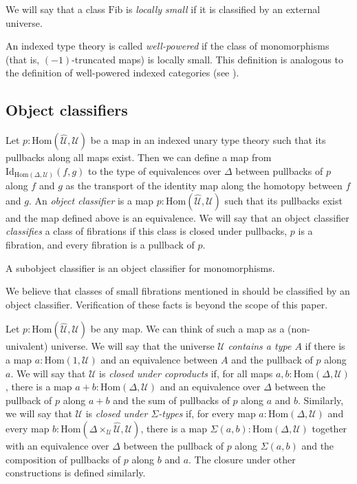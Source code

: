 \documentclass[reqno]{mscs}
\newcommand{\fs}[1]{\mathrm{#1}}
\newcommand{\Hom}{\fs{Hom}}
\newcommand{\Id}{\fs{Id}}
\newcommand{\Fib}{\fs{Fib}}
\numberwithin{figure}{section}
\begin{document}
\begin{defn}
We will say that a class $\Fib$ is \emph{locally small} if it is classified by an external universe.
\end{defn}

\begin{example}
An indexed type theory is called \emph{well-powered} if the class of monomorphisms (that is, $(-1)$-truncated maps) is locally small.
This definition is analogous to the definition of well-powered indexed categories (see \cite[Example~B1.3.14]{elephant}).
\end{example}

\subsection{Object classifiers}

Let $p : \Hom(\widehat{\mathcal{U}},\mathcal{U})$ be a map in an indexed unary type theory such that its pullbacks along all maps exist.
Then we can define a map from $\Id_{\Hom(\Delta,\mathcal{U})}(f,g)$ to the type of equivalences over $\Delta$ between pullbacks of $p$ along $f$ and $g$ as the transport of the identity map along the homotopy between $f$ and $g$.
An \emph{object classifier} is a map $p : \Hom(\widehat{\mathcal{U}},\mathcal{U})$ such that its pullbacks exist and the map defined above is an equivalence.
We will say that an object classifier \emph{classifies} a class of fibrations if this class is closed under pullbacks, $p$ is a fibration, and every fibration is a pullback of $p$.

\begin{example}
A subobject classifier is an object classifier for monomorphisms.
\end{example}

\begin{example}
We believe that classes of small fibrations mentioned in  should be classified by an object classifier.
Verification of these facts is beyond the scope of this paper.
\end{example}

Let $p : \Hom(\widehat{\mathcal{U}},\mathcal{U})$ be any map.
We can think of such a map as a (non-univalent) universe.
We will say that the universe $\mathcal{U}$ \emph{contains a type $A$} if there is a map $a : \Hom(1,\mathcal{U})$ and an equivalence between $A$ and the pullback of $p$ along $a$.
We will say that $\mathcal{U}$ is \emph{closed under coproducts} if, for all maps $a,b : \Hom(\Delta,\mathcal{U})$, there is a map $a + b : \Hom(\Delta,\mathcal{U})$
and an equivalence over $\Delta$ between the pullback of $p$ along $a + b$ and the sum of pullbacks of $p$ along $a$ and $b$.
Similarly, we will say that $\mathcal{U}$ is \emph{closed under $\Sigma$-types} if, for every map $a : \Hom(\Delta,\mathcal{U})$
and every map $b : \Hom(\Delta \times_\mathcal{U} \widehat{\mathcal{U}}, \mathcal{U})$, there is a map $\Sigma(a,b) : \Hom(\Delta,\mathcal{U})$
together with an equivalence over $\Delta$ between the pullback of $p$ along $\Sigma(a,b)$ and the composition of pullbacks of $p$ along $b$ and $a$.
The closure under other constructions is defined similarly.
\end{document}
